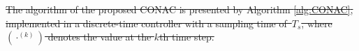 \documentclass[letterpaper, journal]{IEEEtran}
\providecommand{\DIFdel}[1]{{\protect\color{red}\sout{#1}}} %
\providecommand{\DIFdelbegin}{} %
\providecommand{\DIFdelend}{} %
\begin{document}
\DIFdelbegin \DIFdel{The algorithm of the proposed CONAC is presented by Algorithm \ref{alg:CONAC}, implemented in a discrete-time controller with a sampling time of~$T_s$, where $(\cdot^{(k)})$ denotes the value at the $k$th time step.
}\DIFdelend %
\end{document}
